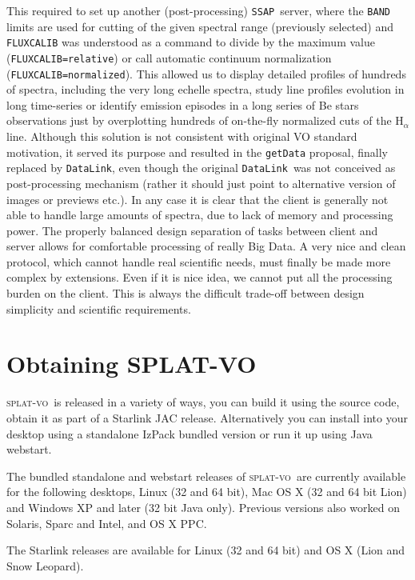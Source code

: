 \documentclass[final,authoryear,5p,times,twocolumn]{elsarticle}
\newcommand{\datalink}{\texttt{DataLink}}
\newcommand{\ssap}{\texttt{SSAP}}
\newcommand{\splatvo}{\textsc{splat-vo}}
\begin{document}
This required to set up another (post-processing) \ssap\ server, where
the \texttt{BAND} limits are used for cutting of the given spectral
range (previously selected) and \texttt{FLUXCALIB} was understood as a
command to divide by the maximum value (\texttt{FLUXCALIB=relative})
or call automatic continuum normalization
(\texttt{FLUXCALIB=normalized}).  This allowed us to display detailed
profiles of hundreds of spectra, including the very long echelle
spectra, study line profiles evolution in long time-series or identify
emission episodes in a long series of Be stars observations just by
overplotting hundreds of on-the-fly normalized cuts of the H$_\alpha$
line.  Although this solution is not consistent with original VO
standard motivation, it served its purpose and resulted in the
\texttt{getData} proposal, finally replaced by \datalink, even though
the original \datalink\ was not conceived as post-processing mechanism
(rather it should just point to alternative version of images or
previews etc.).  In any case it is clear that the client is generally
not able to handle large amounts of spectra, due to lack of memory and
processing power. The properly balanced design separation of tasks
between client and server allows for comfortable processing of really
Big Data.  A very nice and clean protocol, which cannot handle real
scientific needs, must finally be made more complex by
extensions. Even if it is nice idea, we cannot put all the processing
burden on the client.  This is always the difficult trade-off between
design simplicity and scientific requirements.


\section{Obtaining SPLAT-VO}

\splatvo\ is released in a variety of ways, you can build it using the source
code, obtain it as part of a Starlink JAC release. Alternatively you can
install into your desktop using a standalone IzPack bundled version or run it
up using Java webstart.

The bundled standalone and webstart releases of \splatvo\ are currently
available for the following desktops, Linux (32 and 64 bit), Mac OS X (32 and
64 bit Lion) and Windows XP and later (32 bit Java only). Previous versions
also worked on Solaris, Sparc and Intel, and OS X PPC.

The Starlink releases
\citep[e.g.,][]{currie_adassxxiii,2013ASPC..475..247B} are available
for Linux (32 and 64 bit) and OS X (Lion and Snow Leopard).
\end{document}

